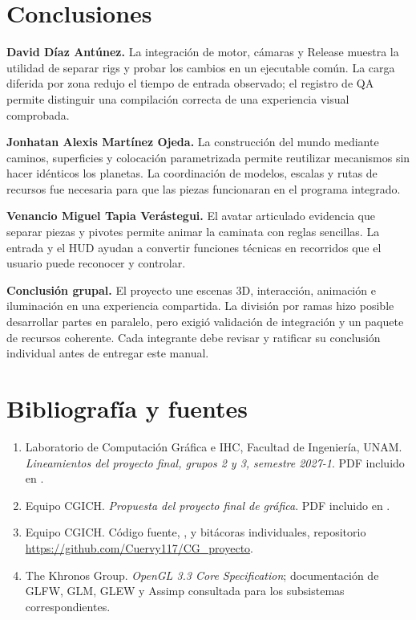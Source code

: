 \documentclass[10pt,letterpaper]{article}
\newcommand{\ruta}[1]{\path{#1}}
\begin{document}
\section{Conclusiones}
\textbf{David Díaz Antúnez.} La integración de motor, cámaras y Release muestra la utilidad de separar rigs y probar los cambios en un ejecutable común. La carga diferida por zona redujo el tiempo de entrada observado; el registro de QA permite distinguir una compilación correcta de una experiencia visual comprobada.

\textbf{Jonhatan Alexis Martínez Ojeda.} La construcción del mundo mediante caminos, superficies y colocación parametrizada permite reutilizar mecanismos sin hacer idénticos los planetas. La coordinación de modelos, escalas y rutas de recursos fue necesaria para que las piezas funcionaran en el programa integrado.

\textbf{Venancio Miguel Tapia Verástegui.} El avatar articulado evidencia que separar piezas y pivotes permite animar la caminata con reglas sencillas. La entrada y el HUD ayudan a convertir funciones técnicas en recorridos que el usuario puede reconocer y controlar.

\textbf{Conclusión grupal.} El proyecto une escenas 3D, interacción, animación e iluminación en una experiencia compartida. La división por ramas hizo posible desarrollar partes en paralelo, pero exigió validación de integración y un paquete de recursos coherente. Cada integrante debe revisar y ratificar su conclusión individual antes de entregar este manual.

\section{Bibliografía y fuentes}
\begin{enumerate}[leftmargin=*]
\item Laboratorio de Computación Gráfica e IHC, Facultad de Ingeniería, UNAM. \emph{Lineamientos del proyecto final, grupos 2 y 3, semestre 2027-1}. PDF incluido en \ruta{docs/}.
\item Equipo CGICH. \emph{Propuesta del proyecto final de gráfica}. PDF incluido en \ruta{docs/}.
\item Equipo CGICH. Código fuente, \ruta{README.md}, \ruta{PLAN_MAESTRO.md} y bitácoras individuales, repositorio \url{https://github.com/Cuervy117/CG_proyecto}.
\item The Khronos Group. \emph{OpenGL 3.3 Core Specification}; documentación de GLFW, GLM, GLEW y Assimp consultada para los subsistemas correspondientes.
\end{enumerate}
\end{document}
